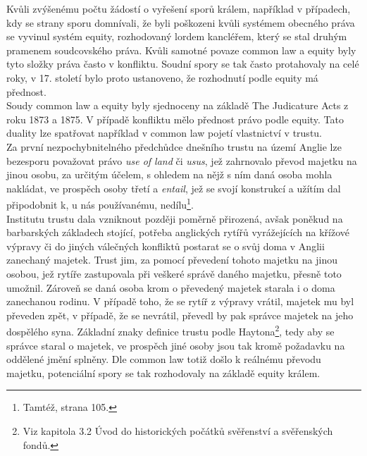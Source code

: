 \documentclass{article}
\begin{document}
Kvůli zvýšenému počtu žádostí o vyřešení sporů králem, například v případech, kdy se strany sporu domnívali, že byli poškozeni kvůli systémem obecného práva se vyvinul systém equity, rozhodovaný lordem kancléřem, který se stal druhým pramenem soudcovského práva. Kvůli samotné povaze common law a equity byly tyto složky práva často v konfliktu. Soudní spory se tak často protahovaly na celé roky, v 17. století bylo proto ustanoveno, že rozhodnutí podle equity má přednost.\\

Soudy common law a equity byly sjednoceny na základě The Judicature Acts z roku 1873 a 1875. V případě konfliktu mělo přednost právo podle equity. Tato duality lze spatřovat například v common law pojetí vlastnictví v trustu.\\

Za první nezpochybnitelného předchůdce dnešního trustu na území Anglie lze bezesporu považovat právo \textit{use of land} či \textit{usus}, jež zahrnovalo převod majetku na jinou osobu, za určitým účelem, s ohledem na nějž s ním daná osoba mohla nakládat, ve prospěch osoby třetí a \textit{entail}, jež se svojí konstrukcí a užítím dal připodobnit k, u nás používanému, nedílu\footnote{Tamtéž, strana 105.}. \\

Institutu trustu dala vzniknout později poměrně přirozená, avšak poněkud na barbarských základech stojící, potřeba anglických rytířů vyrážejících na křížové výpravy či do jiných válečných konfliktů postarat se o svůj doma v Anglii zanechaný majetek. Trust jim, za pomocí převedení tohoto majetku na jinou osobou, jež rytíře zastupovala při veškeré správě daného majetku, přesně toto umožnil. Zároveň se daná osoba krom o převedený majetek starala i o doma zanechanou rodinu. V případě toho, že se rytíř z výpravy vrátil, majetek mu byl převeden zpět, v případě, že se nevrátil, převedl by pak správce majetek na jeho dospělého syna. Základní znaky definice trustu podle Haytona\footnote{Viz kapitola 3.2 Úvod do historických počátků svěřenství a svěřenských fondů.}, tedy aby se správce staral o majetek, ve prospěch jiné osoby jsou tak kromě požadavku na oddělené jmění splněny. Dle common law totiž došlo k reálnému převodu majetku, potenciální spory se tak rozhodovaly na základě equity králem.\\
\end{document}
